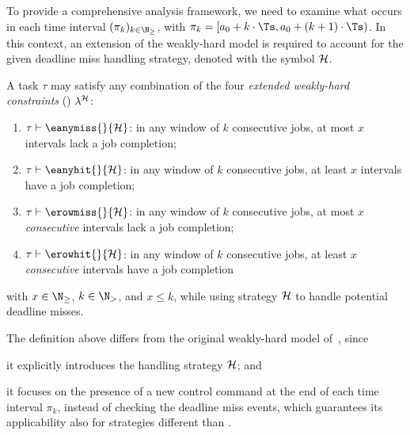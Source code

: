 To provide a comprehensive analysis framework, we need to examine what occurs in each time interval $(\pi_k)_{k \in \N_{\geq}}$, with $\pi_k = [a_0 + k\cdot \Ts, a_0 + (k+1)\cdot \Ts)$. 
In this context, an extension of the weakly-hard model is required to account for the given deadline miss handling strategy, denoted with the symbol $\mathcal{H}$.
%
\begin{definition}%
    \label{def:new-mk}%
    A task $\tau$ may satisfy any combination of the four \emph{extended weakly-hard constraints} (\ewhc{}) $\lambda^{\mathcal{H}}$:
    \begin{enumerate}[label=(\roman*)]
        \item $\tau \vdash \eanymiss{}{\strat}$: in any window of $k$ consecutive jobs, at most $x$ intervals lack a job completion;
        \item $\tau \vdash \eanyhit{}{\strat}$:  in any window of $k$ consecutive jobs, at least $x$ intervals have a job completion;
        \item $\tau \vdash \erowmiss{}{\strat}$: in any window of $k$ consecutive jobs, at most $x$ \emph{consecutive} intervals lack a job completion;
        \item $\tau \vdash \erowhit{}{\strat}$: in any window of $k$ consecutive jobs, at least $x$ \emph{consecutive} intervals have a job completion
    \end{enumerate}
    with $x\in \N_{\geq}$, $k \in \N_{>}$, and $x\leq k$, while using strategy $\mathcal{H}$ to handle potential deadline misses.
\end{definition}
%
The definition above differs from the original weakly-hard model of~\cite{Bernat:2001}, since
\begin{enumerate*}[label=(\roman*)]
    \item it explicitly introduces the handling strategy $\mathcal{H}$; and
    \item it focuses on the presence of a new control command at the end of each time interval $\pi_k$, instead of checking the deadline miss events, which guarantees its applicability also for strategies different than \tK{}.
\end{enumerate*}

